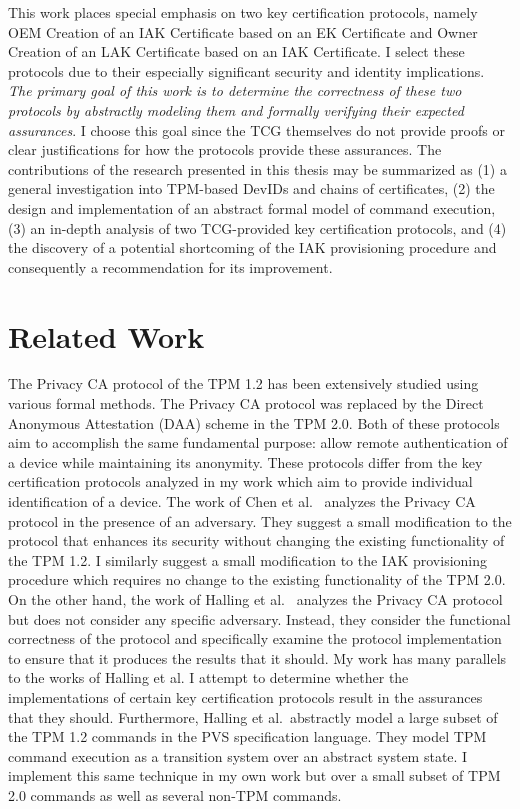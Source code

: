\documentclass[runningheads]{llncs}
\begin{document}
This work places special emphasis on two key certification protocols, namely OEM Creation of an IAK Certificate based on an EK Certificate and Owner Creation of an LAK Certificate based on an IAK Certificate. I select these protocols due to their especially significant security and identity implications. \textit{The primary goal of this work is to determine the correctness of these two protocols by abstractly modeling them and formally verifying their expected assurances}. I choose this goal since the TCG themselves do not provide proofs or clear justifications for how the protocols provide these assurances. 
The contributions of the research presented in this thesis may be summarized as (1) a general investigation into TPM-based DevIDs and chains of certificates, (2) the design and implementation of an abstract formal model of command execution, (3) an in-depth analysis of two TCG-provided key certification protocols, and (4) the discovery of a potential shortcoming of the IAK provisioning procedure and consequently a recommendation for its improvement.

\section{Related Work}
The Privacy CA protocol of the TPM 1.2 has been extensively studied using various formal methods. The Privacy CA protocol was replaced by the Direct Anonymous Attestation (DAA) scheme in the TPM 2.0. Both of these protocols aim to accomplish the same fundamental purpose: allow remote authentication of a device while maintaining its anonymity. These protocols differ from the key certification protocols analyzed in my work which aim to provide individual identification of a device.
The work of Chen et al.\ \citep{PrivacyCAAnalysis-Chen} analyzes the Privacy CA protocol in the presence of an adversary. They suggest a small modification to the protocol that enhances its security without changing the existing functionality of the TPM 1.2. I similarly suggest a small modification to the IAK provisioning procedure which requires no change to the existing functionality of the TPM 2.0.
On the other hand, the work of Halling et al.\ \citep{PrivacyCAAnalysis-Hall,TPM12Model} analyzes the Privacy CA protocol but does not consider any specific adversary. Instead, they consider the functional correctness of the protocol and specifically examine the protocol implementation to ensure that it produces the results that it should.  
My work has many parallels to the works of Halling et al. 
I attempt to determine whether the implementations of certain key certification protocols result in the assurances that they should.
Furthermore, Halling et al.\ abstractly model a large subset of the TPM 1.2 commands in the PVS specification language. They model TPM command execution as a transition system over an abstract system state. I implement this same technique in my own work but over a small subset of TPM 2.0 commands as well as several non-TPM commands. 
\end{document}
